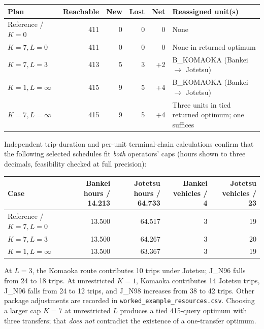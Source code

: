 \documentclass[10pt]{article}
\newcommand{\st}[1]{\texttt{\footnotesize #1}}
\begin{document}
\begin{center}\small
\begin{tabular}{@{}lrrrrp{3.2cm}@{}}\toprule
Plan & Reachable & New & Lost & Net & Reassigned unit(s)\\\midrule
Reference / $K=0$ & 411 & 0 & 0 & 0 & None\\
$K=7,L=0$ & 411 & 0 & 0 & 0 & None in returned optimum\\
$K=7,L=3$ & 413 & 5 & 3 & +2 & B\_KOMAOKA (Bankei $\to$ Jotetsu)\\
$K=1,L=\infty$ & 415 & 9 & 5 & +4 & B\_KOMAOKA (Bankei $\to$ Jotetsu)\\
$K=7,L=\infty$ & 415 & 9 & 5 & +4 & Three units in tied returned optimum; one suffices\\
\bottomrule\end{tabular}
\end{center}
Independent trip-duration and per-unit terminal-chain calculations confirm that the following selected schedules fit \emph{both} operators' caps (hours shown to three decimals, feasibility checked at full precision):
\begin{center}\small
\begin{tabular}{@{}lrrrr@{}}\toprule
Case & Bankei hours / 14.213 & Jotetsu hours / 64.733 & Bankei vehicles / 4 & Jotetsu vehicles / 23\\\midrule
Reference / $K=7,L=0$ & 13.500 & 64.517 & 3 & 19\\
$K=7,L=3$ & 13.500 & 64.267 & 3 & 20\\
$K=1,L=\infty$ & 13.500 & 63.367 & 3 & 19\\
\bottomrule\end{tabular}
\end{center}
At $L=3$, the Komaoka route contributes 10 trips under Jotetsu; J\_N96 falls from 24 to 18 trips. At unrestricted $K=1$, Komaoka contributes 14 Jotetsu trips, J\_N96 falls from 24 to 12 trips, and J\_N98 increases from 38 to 42 trips. Other package adjustments are recorded in \st{worked\_example\_resources.csv}. Choosing a larger cap $K=7$ at unrestricted $L$ produces a tied 415-query optimum with three transfers; that \emph{does not} contradict the existence of a one-transfer optimum.
\end{document}
